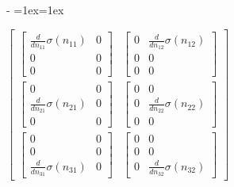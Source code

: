 \documentclass[letterpaper,10pt,english]{sphinxmanual}
\makeatletter
\newenvironment{nbsphinxfancyoutput}{%
    \let\sphinxincludegraphics\nbsphinxincludegraphics
    \nbsphinx@image@maxheight\textheight
    \advance\nbsphinx@image@maxheight -2\fboxsep   %
    \advance\nbsphinx@image@maxheight -2\fboxrule  %
    \advance\nbsphinx@image@maxheight -\baselineskip
\def\nbsphinxfcolorbox{\spx@fcolorbox{nbsphinx-code-border}{white}}%
\def\FrameCommand{\nbsphinxfcolorbox\nbsphinxfancyaddprompt\@empty}%
\def\FirstFrameCommand{\nbsphinxfcolorbox\nbsphinxfancyaddprompt\sphinxVerbatim@Continues}%
\def\MidFrameCommand{\nbsphinxfcolorbox\sphinxVerbatim@Continued\sphinxVerbatim@Continues}%
\def\LastFrameCommand{\nbsphinxfcolorbox\sphinxVerbatim@Continued\@empty}%
\MakeFramed{\advance\hsize-\width\@totalleftmargin\z@\linewidth\hsize\@setminipage}%
\lineskip=1ex\lineskiplimit=1ex\raggedright%
}{\par\unskip\@minipagefalse\endMakeFramed}
\def\nbsphinxfancyaddprompt{\ifvoid\nbsphinxpromptbox\else
    \kern\fboxrule\kern\fboxsep
    \copy\nbsphinxpromptbox
    \kern-\ht\nbsphinxpromptbox\kern-\dp\nbsphinxpromptbox
    \kern-\fboxsep\kern-\fboxrule\nointerlineskip
    \fi}
\newcommand*{\nbsphinxincludegraphics}[2][]{%
    \gdef\spx@includegraphics@options{#1}%
    \setbox\spx@image@box\hbox{\texttt{[image: \#2]}}%
    \in@false
    \ifdim \wd\spx@image@box>\linewidth
      \g@addto@macro\spx@includegraphics@options{,width=\linewidth}%
      \in@true
    \fi
    \ifdim \ht\spx@image@box>\nbsphinx@image@maxheight
      \g@addto@macro\spx@includegraphics@options{,height=\nbsphinx@image@maxheight}%
      \in@true
    \fi
    \ifin@
      \g@addto@macro\spx@includegraphics@options{,keepaspectratio}%
    \fi
    \setbox\spx@image@box\box\voidb@x %
    \expandafter\includegraphics\expandafter[\spx@includegraphics@options]{#2}%
}%
\makeatother
\begin{document}
\begin{nbsphinxfancyoutput}
$\displaystyle \left[\begin{matrix}\left[\begin{matrix}\frac{d}{d n_{11}} \sigma{\left(n_{11} \right)} & 0\\0 & 0\\0 & 0\end{matrix}\right] & \left[\begin{matrix}0 & \frac{d}{d n_{12}} \sigma{\left(n_{12} \right)}\\0 & 0\\0 & 0\end{matrix}\right]\\\left[\begin{matrix}0 & 0\\\frac{d}{d n_{21}} \sigma{\left(n_{21} \right)} & 0\\0 & 0\end{matrix}\right] & \left[\begin{matrix}0 & 0\\0 & \frac{d}{d n_{22}} \sigma{\left(n_{22} \right)}\\0 & 0\end{matrix}\right]\\\left[\begin{matrix}0 & 0\\0 & 0\\\frac{d}{d n_{31}} \sigma{\left(n_{31} \right)} & 0\end{matrix}\right] & \left[\begin{matrix}0 & 0\\0 & 0\\0 & \frac{d}{d n_{32}} \sigma{\left(n_{32} \right)}\end{matrix}\right]\end{matrix}\right]$
\end{nbsphinxfancyoutput}

{
\begin{sphinxVerbatim}[commandchars=\\\{\}]
\llap{\color{nbsphinxin}[56]:\,\hspace{\fboxrule}\hspace{\fboxsep}}
\end{sphinxVerbatim}
}
\end{document}

